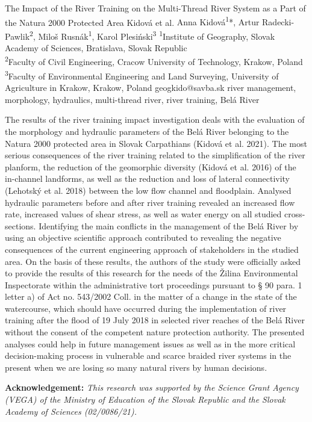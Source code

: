 
\abstract
{The Impact of the River Training on the Multi-Thread River System as a Part of the Natura 2000 Protected Area} 
{Kidová et al.} 
{Anna Kidová\textsuperscript{1}*, Artur Radecki-Pawlik\textsuperscript{2}, Miloš Rusnák\textsuperscript{1}, Karol Plesiński\textsuperscript{3}} 
{\KLtag} 
{
	\textsuperscript{1}Institute of Geography, Slovak Academy of Sciences, Bratislava, Slovak Republic\\
	\textsuperscript{2}Faculty of Civil Engineering, Cracow University of Technology, Krakow, Poland\\
	\textsuperscript{3}Faculty of Environmental Engineering and Land Surveying, University of Agriculture in Krakow, Krakow, Poland
}
{geogkido@savba.sk}  %
{river management, morphology, hydraulics, multi-thread river, river training, Belá River}
{The results of the river training impact investigation deals with the evaluation of the morphology and hydraulic parameters of the Belá River belonging to the Natura 2000 protected area in Slovak Carpathians (Kidová et al. 2021). The most serious consequences of the river training related to the simplification of the river planform, the reduction of the geomorphic diversity (Kidová et al. 2016) of the in-channel landforms, as well as the reduction and loss of lateral connectivity (Lehotský et al. 2018) between the low flow channel and floodplain. Analysed hydraulic parameters before and after river training revealed an increased flow rate, increased values of shear stress, as well as water energy on all studied cross-sections. Identifying the main conflicts in the management of the Belá River by using an objective scientific approach contributed to revealing the negative consequences of the current engineering approach of stakeholders in the studied area. On the basis of these results, the authors of the study were officially asked to provide the results of this research for the needs of the Žilina Environmental Inspectorate within the administrative tort proceedings pursuant to § 90 para. 1 letter a) of Act no. 543/2002 Coll. in the matter of a change in the state of the watercourse, which should have occurred during the implementation of river training after the flood of 19 July 2018 in selected river reaches of the Belá River without the consent of the competent nature protection authority. The presented analyses could help in future management issues as well as in the more critical decision-making process in vulnerable and scarce braided river systems in the present when we are losing so many natural rivers by human decisions.

\noindent
\textbf{Acknowledgement:}\textit{
This research was supported by the Science Grant Agency (VEGA) of the Ministry of Education of the Slovak Republic and the Slovak Academy of Sciences (02/0086/21).}
}

